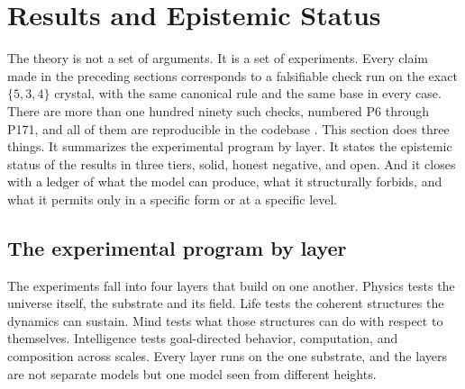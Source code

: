 \section{Results and Epistemic Status}

The theory is not a set of arguments. It is a set of experiments. Every claim made in the preceding sections
corresponds to a falsifiable check run on the exact $\{5,3,4\}$ crystal, with the same canonical rule and the
same base in every case. There are more than one hundred ninety such checks, numbered P6 through P171, and all
of them are reproducible in the codebase \cite{pollard2026vibetest}. This section does three things. It
summarizes the experimental program by layer. It states the epistemic status of the results in three tiers,
solid, honest negative, and open. And it closes with a ledger of what the model can produce, what it
structurally forbids, and what it permits only in a specific form or at a specific level.

\subsection{The experimental program by layer}

The experiments fall into four layers that build on one another. Physics tests the universe itself, the
substrate and its field. Life tests the coherent structures the dynamics can sustain. Mind tests what those
structures can do with respect to themselves. Intelligence tests goal-directed behavior, computation, and
composition across scales. Every layer runs on the one substrate, and the layers are not separate models but
one model seen from different heights.

